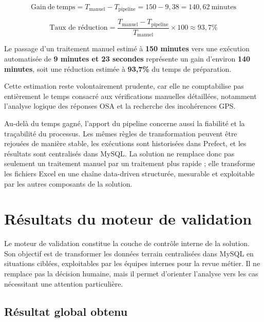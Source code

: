 \[
\mathrm{Gain\ de\ temps} =
T_{\mathrm{manuel}} - T_{\mathrm{pipeline}}
= 150 - 9{,}38
= 140{,}62 \ \mathrm{minutes}
\]

\[
\text{Taux de réduction} =
\frac{T_{\mathrm{manuel}} - T_{\mathrm{pipeline}}}
{T_{\mathrm{manuel}}}
\times 100
\approx 93{,}7\%
\]

\begin{tcolorbox}[
    colback=green!4,
    colframe=green!45!black,
    title=\textbf{Gain réel mesuré},
    fonttitle=\bfseries,
    arc=2mm,
    boxrule=0.6pt,
    left=6pt,
    right=6pt,
    top=6pt,
    bottom=6pt
]
Le passage d’un traitement manuel estimé à \textbf{150 minutes} vers une exécution automatisée de \textbf{9 minutes et 23 secondes} représente un gain d’environ \textbf{140 minutes}, soit une réduction estimée à \textbf{93,7\%} du temps de préparation.
\end{tcolorbox}

Cette estimation reste volontairement prudente, car elle ne comptabilise pas entièrement le temps consacré aux vérifications manuelles détaillées, notamment l’analyse logique des réponses OSA et la recherche des incohérences GPS.

Au-delà du temps gagné, l’apport du pipeline concerne aussi la fiabilité et la traçabilité du processus. Les mêmes règles de transformation peuvent être rejouées de manière stable, les exécutions sont historisées dans Prefect, et les résultats sont centralisés dans MySQL. La solution ne remplace donc pas seulement un traitement manuel par un traitement plus rapide ; elle transforme les fichiers Excel en une chaîne data-driven structurée, mesurable et exploitable par les autres composants de la solution.

\section{Résultats du moteur de validation}

Le moteur de validation constitue la couche de contrôle interne de la solution. Son objectif est de transformer les données terrain centralisées dans MySQL en situations ciblées, exploitables par les équipes internes pour la revue métier. Il ne remplace pas la décision humaine, mais il permet d’orienter l’analyse vers les cas nécessitant une attention particulière.

\subsection{Résultat global obtenu}

